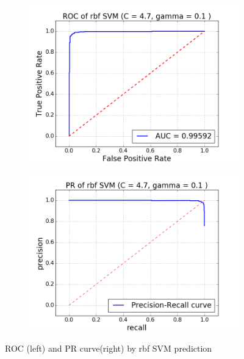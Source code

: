 \documentclass{article}
\begin{document}
\begin{singlespacing}
\begin{figure}[H]
    \centering
    \begin{subfigure}[b]{0.4\textwidth}
        \includegraphics[width=\textwidth]{rsvm_roc.png}
    \end{subfigure}
    \begin{subfigure}[b]{0.4\textwidth}
        \includegraphics[width=\textwidth]{rsvm_pr.png}
    \end{subfigure}
    \caption{ROC (left) and PR curve(right) by rbf SVM prediction}\label{fig:rsvm}
\end{figure}


\end{singlespacing}
\end{document}
